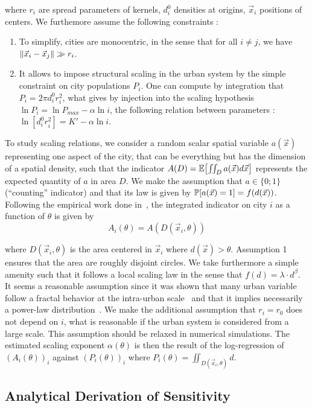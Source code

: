 where $r_i$ are spread parameters of kernels, $d_i^0$ densities at origins, $\vec{x}_i$ positions of centers. We furthemore assume the following constraints :

\begin{enumerate}
\item To simplify, cities are monocentric, in the sense that for all $i\neq j$, we have $\| \vec{x}_i - \vec{x}_j \|\gg r_i$.
\item It allows to impose structural scaling in the urban system by the simple constraint on city populations $P_i$. One can compute by integration that $P_i=2\pi d_i^0 r_i^2$, what gives by injection into the scaling hypothesis $\ln{P_i}=\ln{P_{max}}-\alpha \ln{i}$, the following relation between parameters : $\ln{\left[d_i^0 r_i^2\right]}=K' - \alpha \ln{i}$.
\end{enumerate}

To study scaling relations, we consider a random scalar spatial variable $a(\vec{x})$ representing one aspect of the city, that can be everything but has the dimension of a spatial density, such that the indicator $A(D)=\operatorname{\mathbb{E}}\!\left[\iint_D{a(\vec{x})d\vec{x}}\right]$ represents the expected quantity of $a$ in area $D$. We make the assumption that $a\in \{0;1\}$ (``counting'' indicator) and that its law is given by $\operatorname{\mathbb{P}}\!\left[a(\vec{x})=1\right]=f(d(\vec{x}))$. Following the empirical work done in~\cite{cottineau2015scaling}, the integrated indicator on city $i$ as a function of $\theta$ is given by
\[
A_i(\theta) = A(D(\vec{x}_i, \theta))
\]

where $D(\vec{x}_i, \theta)$ is the area centered in $\vec{x}_i$ where $d(\vec{x})>\theta$. Assumption 1 ensures that the area are roughly disjoint circles. We take furthermore a simple amenity such that it follows a local scaling law in the sense that $f(d)=\lambda\cdot d^\beta$. It seems a reasonable assumption since it was shown that many urban variable follow a fractal behavior at the intra-urban scale~\cite{keersmaecker2003using} and that it implies necessarily a power-law distribution~\cite{chen2010characterizing}. We make the additional assumption that $r_i=r_0$ does not depend on $i$, what is reasonable if the urban system is considered from a large scale. This assumption should be relaxed in numerical simulations. The estimated scaling exponent $\alpha(\theta)$ is then the result of the log-regression of $(A_i(\theta))_i$ against $(P_i(\theta))_i$ where $P_i(\theta)=\iint_{D(\vec{x}_i,\theta)}{d}$.


\subsection{Analytical Derivation of Sensitivity}

